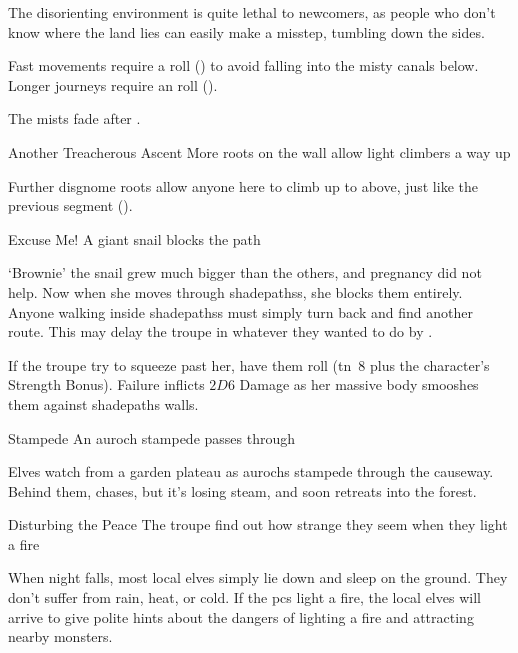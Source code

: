The disorienting environment is quite lethal to newcomers, as people who don't know where the land lies can easily make a misstep, tumbling down the sides.

Fast movements require a  roll (\tn[8]) to avoid falling into the misty canals below.
Longer journeys require an  roll (\tn[10]).

The mists fade after .

{Another Treacherous Ascent}%
{More roots on the wall allow light climbers a way up}%

Further \gls{disgnome} roots allow anyone here to climb up to  above, just like the previous \gls{segment} ().


{Excuse Me!}%
{A giant snail blocks the path}%

`Brownie' the snail grew much bigger than the others, and pregnancy did not help.
Now when she moves through \glspl{shadepaths}, she blocks them entirely.
Anyone walking inside \glspl{shadepaths} must simply turn back and find another route.
This may delay the troupe in whatever they wanted to do by .

If the troupe try to squeeze past her, have them roll  (\gls{tn}~8 plus the character's Strength Bonus).
Failure inflicts $2D6$ Damage as her massive body smooshes them against \gls{shadepaths} walls.

{Stampede}%
{An auroch stampede passes through}%

\label{sunwayEarthIngredients}
Elves watch from a garden plateau as aurochs stampede through the causeway.
Behind them,  chases, but it's losing steam, and soon retreats into the forest.

{Disturbing the Peace}%
{The troupe find out how strange they seem when they light a fire}%

When night falls, most local elves simply lie down and sleep on the ground.
They don't suffer from rain, heat, or cold.%
If the \glspl{pc} light a fire, the local elves will arrive to give polite
hints about the dangers of lighting a fire and attracting nearby
\glspl{monster}.

